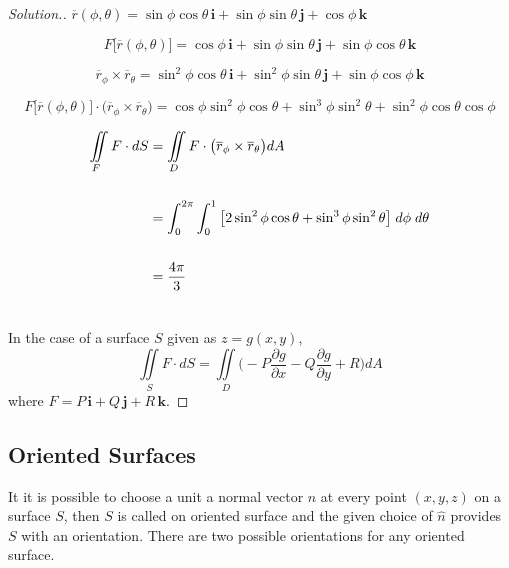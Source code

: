 \documentclass[11pt,a4paper]{article}
\theoremstyle{definition}
\newenvironment{solution}
  {\renewcommand{\qedsymbol}{}\begin{proof}[\textit{Solution}.]}
  {\end{proof}}
\begin{document}
\begin{solution}


$\overline{r}(\phi, \theta) = \sin \phi \cos \theta\, \textbf{i} + \sin \phi \sin \theta\, \textbf{j} + \cos \phi\, \textbf{k}$

$$F\big[\overline{r}(\phi,\theta)\big] = \cos \phi\, \textbf{i} + \sin \phi \sin \theta \,\textbf{j} + \sin \phi \cos \theta \,\textbf{k}$$

$$\overline{r}_{\phi} \times \overline{r}_{\theta} = \sin^2 \phi \cos \theta\, \textbf{i} + \sin^2\phi \sin \theta\, \textbf{j} + \sin \phi \cos \phi\, \textbf{k}$$

$$F\big[\overline{r}(\phi,\theta)\big] \cdot \big(\overline{r}_{\phi} \times \overline{r}_{\theta}\big)= \cos \phi \sin^2 \phi \cos \theta + \sin^3\phi \sin^2\theta + \sin^2\phi \cos\theta \cos \phi$$


\begin{align*}
\iint\limits_F F\cdot dS & = \iint\limits_D F\cdot \big(\overline{r}_{\phi} \times \overline{r}_{\theta}\big) dA\\\\
& = \int^{2\pi}_0\int^1_0\big[2\sin^2\phi \cos \theta + \sin^3\phi \sin^2\theta\big]\hspace{0.1cm}d\phi\hspace{0.1cm}d\theta\\\\
& = \frac{4\pi}{3}\\\\
\end{align*}

In the case of a surface $S$ given as $z = g(x,y)$, $$\iint\limits_S F\cdot dS = \iint\limits_D \Bigg( -P\dfrac{\partial g}{\partial x}- Q \frac{\partial g}{\partial y} + R\Bigg)dA$$ where $F = P\,\textbf{i} + Q\, \textbf{j} + R\, \textbf{k}$.


\pagebreak
\end{solution}
{\color[wave]{485}\subsection{Oriented Surfaces}}
It it is possible to choose a unit a normal vector $\hat{n}$ at every point $(x,y,z)$ on a surface $S$, then $S$ is called on oriented surface and the given choice of $\widehat{n}$ provides $S$ with an orientation. There are two possible orientations for any oriented surface.

\end{document}
